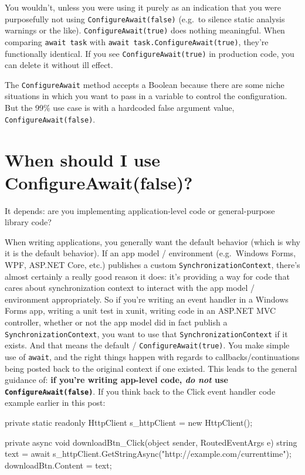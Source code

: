 \documentclass[a4paper,12pt,notitlepage,twoside,openright]{article}
\begin{document}
You wouldn't, unless you were using it purely as an indication that you
were purposefully not using \texttt{ConfigureAwait(false)} (e.g.~to
silence static analysis warnings or the like).
\texttt{ConfigureAwait(true)} does nothing meaningful. When comparing
\texttt{await\ task} with \texttt{await\ task.ConfigureAwait(true)},
they're functionally identical. If you see \texttt{ConfigureAwait(true)}
in production code, you can delete it without ill effect.

The \texttt{ConfigureAwait} method accepts a Boolean because there are
some niche situations in which you want to pass in a variable to control
the configuration. But the 99\% use case is with a hardcoded false
argument value, \texttt{ConfigureAwait(false)}.

\hypertarget{when-should-i-use-configureawaitfalse}{%
\section{When should I use
ConfigureAwait(false)?}\label{when-should-i-use-configureawaitfalse}}

It depends: are you implementing application-level code or
general-purpose library code?

When writing applications, you generally want the default behavior
(which is why it is the default behavior). If an app model / environment
(e.g.~Windows Forms, WPF, ASP.NET Core, etc.) publishes a custom
\texttt{SynchronizationContext}, there's almost certainly a really good
reason it does: it's providing a way for code that cares about
synchronization context to interact with the app model / environment
appropriately. So if you're writing an event handler in a Windows Forms
app, writing a unit test in xunit, writing code in an ASP.NET MVC
controller, whether or not the app model did in fact publish a
\texttt{SynchronizationContext}, you want to use that
\texttt{SynchronizationContext} if it exists. And that means the default
/ \texttt{ConfigureAwait(true)}. You make simple use of \texttt{await},
and the right things happen with regards to callbacks/continuations
being posted back to the original context if one existed. This leads to
the general guidance of: \textbf{if you're writing app-level code,
\emph{do not} use \texttt{ConfigureAwait(false)}}. If you think back to
the Click event handler code example earlier in this post:

\begin{csharpcode}
private static readonly HttpClient s_httpClient = new HttpClient();

private async void downloadBtn_Click(object sender, RoutedEventArgs e)
{
    string text = await s_httpClient.GetStringAsync("http://example.com/currenttime");
    downloadBtn.Content = text;
}
\end{csharpcode}
\end{document}
